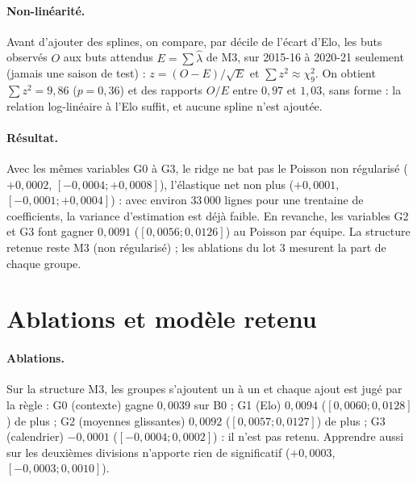 \paragraph{Non-linéarité.} Avant d'ajouter des splines, on compare, par décile de l'écart d'Elo,
les buts observés \(O\) aux buts attendus \(E = \sum \hat\lambda\) de M3, sur 2015-16 à 2020-21
seulement (jamais une saison de test) :
\(z = (O - E)/\sqrt{E}\) et \(\sum z^2 \approx \chi^2_9\). On obtient \(\sum z^2 = 9{,}86\)
(\(p = 0{,}36\)) et des rapports \(O/E\) entre \(0{,}97\) et \(1{,}03\), sans forme : la relation
log-linéaire à l'Elo suffit, et aucune spline n'est ajoutée.

\paragraph{Résultat.} Avec les mêmes variables G0 à G3, le ridge ne bat pas le Poisson non régularisé
(\(+0{,}0002\), \([-0{,}0004 ; +0{,}0008]\)), l'élastique net non plus (\(+0{,}0001\),
\([-0{,}0001 ; +0{,}0004]\)) : avec environ \(33\,000\) lignes pour une trentaine de coefficients, la
variance d'estimation est déjà faible. En revanche, les variables G2 et G3 font gagner \(0{,}0091\)
(\([0{,}0056 ; 0{,}0126]\)) au Poisson par équipe. La structure retenue reste M3 (non régularisé) ; les
ablations du lot 3 mesurent la part de chaque groupe.

\section{Ablations et modèle retenu}
\label{sec:retenu}

\paragraph{Ablations.} Sur la structure M3, les groupes s'ajoutent un à un et chaque ajout est jugé
par la règle : G0 (contexte) gagne \(0{,}0039\) sur B0 ; G1 (Elo) \(0{,}0094\)
(\([0{,}0060 ; 0{,}0128]\)) de plus ; G2 (moyennes glissantes) \(0{,}0092\) (\([0{,}0057 ; 0{,}0127]\)) de
plus ; G3 (calendrier) \(-0{,}0001\) (\([-0{,}0004 ; 0{,}0002]\)) : il n'est pas retenu. Apprendre aussi
sur les deuxièmes divisions n'apporte rien de significatif (\(+0{,}0003\), \([-0{,}0003 ; 0{,}0010]\)).

